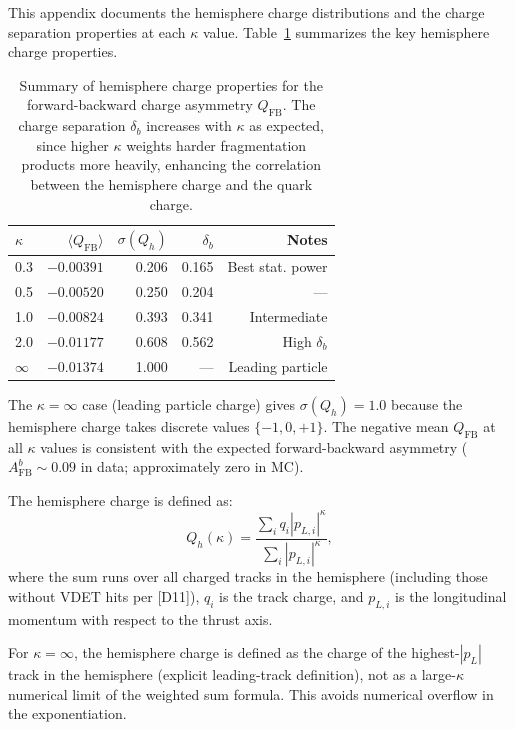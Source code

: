 \documentclass[11pt,a4paper]{article}
\begin{document}
This appendix documents the hemisphere charge distributions and the charge separation
properties at each $\kappa$ value. Table~\ref{tab:hemisphere_charge_properties}
summarizes the key hemisphere charge properties.

\begin{table}[htbp]
\centering
\caption{Summary of hemisphere charge properties for the forward-backward charge
asymmetry $Q_\mathrm{FB}$. The charge separation $\delta_b$ increases with $\kappa$
as expected, since higher $\kappa$ weights harder fragmentation products more heavily,
enhancing the correlation between the hemisphere charge and the quark charge.}
\label{tab:hemisphere_charge_properties}
\begin{tabular}{lrrrr}
\toprule
$\kappa$ & $\langle Q_\mathrm{FB} \rangle$ & $\sigma(Q_h)$ & $\delta_b$ & Notes \\
\midrule
0.3 & $-0.00391$ & 0.206 & 0.165 & Best stat. power \\
0.5 & $-0.00520$ & 0.250 & 0.204 & --- \\
1.0 & $-0.00824$ & 0.393 & 0.341 & Intermediate \\
2.0 & $-0.01177$ & 0.608 & 0.562 & High $\delta_b$ \\
$\infty$ & $-0.01374$ & 1.000 & --- & Leading particle \\
\bottomrule
\end{tabular}
\end{table}

The $\kappa = \infty$ case (leading particle charge) gives $\sigma(Q_h) = 1.0$ because
the hemisphere charge takes discrete values $\{-1, 0, +1\}$. The negative mean
$Q_\mathrm{FB}$ at all $\kappa$ values is consistent with the expected forward-backward
asymmetry ($A_\mathrm{FB}^b \sim 0.09$ in data; approximately zero in MC).

The hemisphere charge is defined as:
\begin{equation}
Q_h(\kappa) = \frac{\sum_i q_i |p_{L,i}|^\kappa}{\sum_i |p_{L,i}|^\kappa},
\label{eq:hemisphere_charge_app}
\end{equation}
where the sum runs over all charged tracks in the hemisphere (including those without
VDET hits per [D11]), $q_i$ is the track charge, and $p_{L,i}$ is the longitudinal
momentum with respect to the thrust axis.

For $\kappa = \infty$, the hemisphere charge is defined as the charge of the
highest-$|p_L|$ track in the hemisphere (explicit leading-track definition), not
as a large-$\kappa$ numerical limit of the weighted sum formula. This avoids
numerical overflow in the exponentiation.
\end{document}
